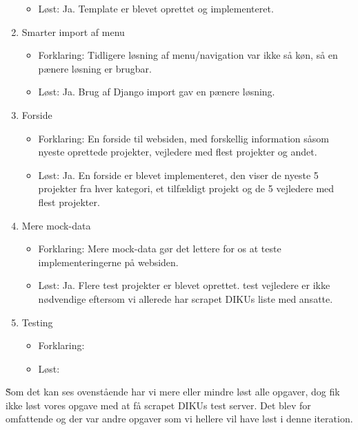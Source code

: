 \documentclass[11pt]{article}
\begin{document}
\begin{enumerate}
\begin{itemize}
        \item Løst: Ja. Template er blevet oprettet og implementeret.
	\end{itemize}
\item Smarter import af menu
	\begin{itemize}
	\item Forklaring: Tidligere løsning af menu/navigation var ikke så køn, så en pænere løsning er brugbar.
        \item Løst: Ja. Brug af Django import gav en pænere løsning.
	\end{itemize}
\item Forside
	\begin{itemize}
	\item Forklaring: En forside til websiden, med forskellig information såsom nyeste oprettede projekter, vejledere med flest projekter og andet.
        \item Løst: Ja. En forside er blevet implementeret, den viser de nyeste 5 projekter fra hver kategori, et tilfældigt projekt og de 5 vejledere med flest projekter.
	\end{itemize}
\item Mere mock-data
	\begin{itemize}
	\item Forklaring: Mere mock-data gør det lettere for os at teste implementeringerne på websiden.
        \item Løst: Ja. Flere test projekter er blevet oprettet. test vejledere er ikke nødvendige eftersom vi allerede har scrapet DIKUs liste med ansatte.
	\end{itemize}
\item Testing
	\begin{itemize}
	\item Forklaring:
        \item Løst:
	\end{itemize}
\end{enumerate}
\~
Som det kan ses ovenstående har vi mere eller mindre løst alle opgaver, dog fik ikke løst vores opgave med at få scrapet DIKUs test server. Det blev for omfattende og der var andre opgaver som vi hellere vil have løst i denne iteration.
\end{document}

